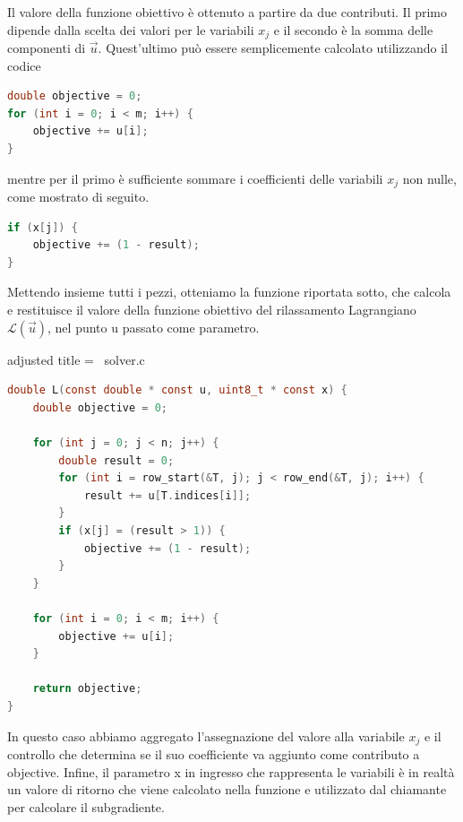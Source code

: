 Il valore della funzione obiettivo è ottenuto a partire da due contributi. Il primo dipende dalla scelta dei valori per
le variabili
\(
    x_j
\)
e il secondo è la somma delle componenti di
\(
    \vec{u}
\). Quest'ultimo può essere semplicemente calcolato utilizzando il codice

\begin{inline}
\begin{lstlisting}[style = style2, language=c]
double objective = 0;
for (int i = 0; i < m; i++) {
    objective += u[i];
}
\end{lstlisting}
\end{inline}
\noindent
mentre per il primo è sufficiente sommare i coefficienti delle variabili \( x_j \) non nulle, come mostrato di seguito.
\begin{inline}
\begin{lstlisting}[style = style2, language=c]
if (x[j]) {
    objective += (1 - result);
}
\end{lstlisting}
\end{inline}
\noindent
Mettendo insieme tutti i pezzi, otteniamo la funzione riportata sotto, che calcola e restituisce il valore della
funzione obiettivo del rilassamento Lagrangiano \( \mathcal{L}(\vec{u}) \), nel punto {\jbm u} passato come parametro.

\begin{code}{adjusted title = {\cicon\ solver.c}}
\begin{lstlisting}[language=c, style = style, caption={Soluzione del rilassamento Lagrangiano.}]
double L(const double * const u, uint8_t * const x) {
    double objective = 0;

    for (int j = 0; j < n; j++) {
        double result = 0;
        for (int i = row_start(&T, j); j < row_end(&T, j); i++) {
            result += u[T.indices[i]];
        }
        if (x[j] = (result > 1)) {
            objective += (1 - result);
        }
    }

    for (int i = 0; i < m; i++) {
        objective += u[i];
    }

    return objective;
}
\end{lstlisting}
\end{code}
\noindent
In questo caso abbiamo aggregato l'assegnazione del valore alla variabile \( x_j \) e il controllo che determina se il
suo coefficiente va aggiunto come contributo a {\jbm objective}.
Infine, il parametro {\jbm x} in ingresso che rappresenta le variabili è in realtà un valore di ritorno che viene
calcolato nella funzione e utilizzato dal chiamante per calcolare il subgradiente.
